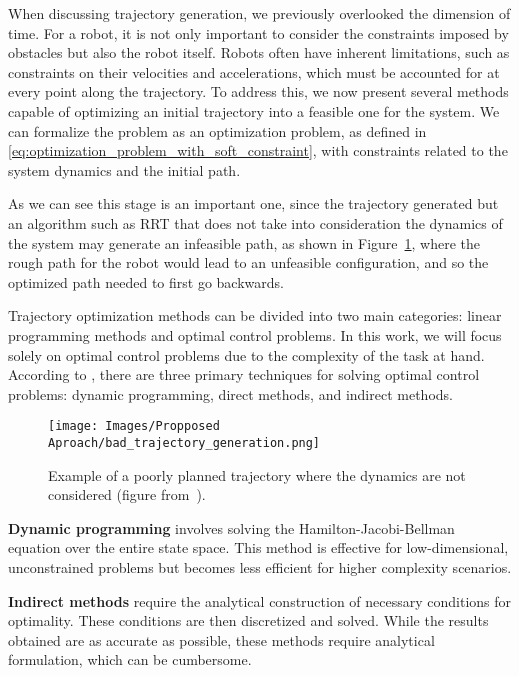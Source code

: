 When discussing trajectory generation, we previously overlooked the dimension of time. For a robot, it is not only important to consider the constraints imposed by obstacles but also the robot itself. Robots often have inherent limitations, such as constraints on their velocities and accelerations, which must be accounted for at every point along the trajectory. To address this, we now present several methods capable of optimizing an initial trajectory into a feasible one for the system. We can formalize the problem as an optimization problem, as defined in \ref{eq:optimization_problem_with_soft_constraint}, with constraints related to the system dynamics and the initial path.

As we can see this stage is an important one, since the trajectory generated but an algorithm such as RRT that does not take into consideration the dynamics of the system may generate an infeasible path, as shown in Figure~\ref{eq:Proposed Approach: Space Cobot: Bad trajectory generation}, where the rough path for the robot would lead to an unfeasible configuration, and so the optimized path needed to first go backwards.

Trajectory optimization methods can be divided into two main categories: linear programming methods and optimal control problems. In this work, we will focus solely on optimal control problems due to the complexity of the task at hand. According to \cite{kelly2017introduction}, there are three primary techniques for solving optimal control problems: dynamic programming, direct methods, and indirect methods.

\begin{figure}[H]
    \centering
    \texttt{[image: Images/Propposed Aproach/bad\_trajectory\_generation.png]}
    \caption{Example of a poorly planned trajectory where the dynamics are not considered (figure from~\cite{bergman2021exploiting}).}
    \label{eq:Proposed Approach: Space Cobot: Bad trajectory generation}
\end{figure}




\textbf{Dynamic programming} involves solving the Hamilton-Jacobi-Bellman equation over the entire state space. This method is effective for low-dimensional, unconstrained problems but becomes less efficient for higher complexity scenarios.

\textbf{Indirect methods} require the analytical construction of necessary conditions for optimality. These conditions are then discretized and solved. While the results obtained are as accurate as possible, these methods require analytical formulation, which can be cumbersome.

